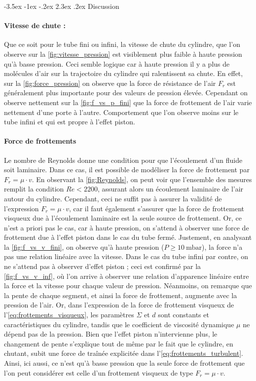 \documentclass[a4paper, 12pt,oneside]{article}
\makeatletter
\renewcommand{\section}{\@startsection {section}{1}{\z@}%
             {-3.5ex \@plus -1ex \@minus -.2ex}%
             {2.3ex \@plus.2ex}%
             {\normalfont\normalsize\bfseries}}
\makeatother
\begin{document}
\section{Discussion}

\paragraph{Vitesse de chute : }

Que ce soit pour le tube fini ou infini, la vitesse de chute du cylindre, que l'on observe sur la \autoref{fig:vitesse_pression} est visiblement plus faible à haute pression qu'à basse pression. Ceci semble logique car à haute pression il y a plus de molécules d'air sur la trajectoire du cylindre qui ralentissent sa chute. En effet, sur la \autoref{fig:force_pression} on observe que la force de résistance de l'air $F_r$ est généralement plus importante pour des valeurs de pression élevée. Cependant on observe nettement sur la \autoref{fig:f_vs_p_fini} que la force de frottement de l'air varie nettement d'une porte à l'autre. Comportement que l'on observe moins sur le tube infini et qui est propre à l'effet piston.

\paragraph{Force de frottements}
Le nombre de Reynolds donne une condition pour que l'écoulement d'un fluide soit laminaire. Dans ce cas, il est possible de modéliser la force de frottement par $F_r = \mu \cdot v$. En observant la \autoref{fig:Reynolds}, on peut voir que l'ensemble des mesures remplit la condition $Re < 2200$, assurant alors un écoulement laminaire de l'air autour du cylindre. Cependant, ceci ne suffit pas à assurer la validité de l'expression $F_r = \mu \cdot v$, car il faut également s'assurer que la force de frottement visqueux due à l'écoulement laminaire est la seule source de frottement. Or, ce n'est a priori pas le cas, car à haute pression, on s'attend à observer une force de frottement due à l'effet piston dans le cas du tube fermé. Justement, en analysant la \autoref{fig:f_vs_v_fini}, on observe qu'à haute pression ($P \geq 10~\mathrm{mbar}$), la force n'a pas une relation linéaire avec la vitesse. Dans le cas du tube infini par contre, on ne s'attend pas à observer d'effet piston ; ceci est confirmé par la \autoref{fig:f_vs_v_inf}, où l'on arrive à observer une relation d'apparence linéaire entre la force et la vitesse pour chaque valeur de pression. Néanmoins, on remarque que la pente de chaque segment, et ainsi la force de frottement, augmente avec la pression de l'air. Or, dans l'expression de la force de frottement visqueux de l'\autoref{eq:frottements_visqueux}, les paramètres $\Sigma$ et $d$ sont constants et caractéristiques du cylindre, tandis que le coefficient de viscosité dynamique $\mu$ ne dépend pas de la pression. Bien que l'effet piston n'intervienne plus, le changement de pente s'explique tout de même par le fait que le cylindre, en chutant, subit une force de traînée explicitée dans l'\autoref{eq:frottements_turbulent}. Ainsi, ici aussi, ce n'est qu'à basse pression que la seule force de frottement que l'on peut considérer est celle d'un frottement visqueux de type $F_r = \mu \cdot v$.
\end{document}
